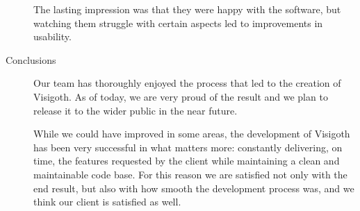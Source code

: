 \documentclass[a4paper,11pt]{article}
\begin{document}
\begin{description}
  The lasting impression was that they were happy with the software,
  but watching them struggle with certain aspects led to improvements
  in usability.

\item[Conclusions]

  Our team has thoroughly enjoyed the process that led to the creation
  of Visigoth. As of today, we are very proud of the result and we plan to
  release it to the wider public in the near future.

  While we could have improved in some areas, the development of
  Visigoth has been very successful in what matters more: constantly
  delivering, on time, the features requested by the client while
  maintaining a clean and maintainable code base.
  For this reason we are satisfied not only with the end
  result, but also with how smooth the development process was, and we
  think our client is satisfied as well.

\end{description}
\end{document}
